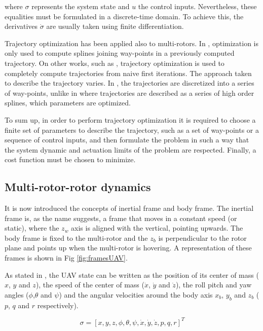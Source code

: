 where $\sigma$ represents the system state and $u$ the control inputs. Nevertheless,  these equalities must be formulated in a discrete-time domain. To achieve this, the derivatives $\dot{\sigma}$ are usually taken using finite differentiation.
\par
Trajectory optimization has been applied also to multi-rotors. In \cite{ref:quad}, optimization is only used to compute splines joining way-points in a previously computed trajectory. On other works, such as \cite{MILP, ETH}, trajectory optimization is used to completely compute trajectories from naive first iterations. The approach taken to describe the trajectory varies. In \cite{MILP}, the trajectories are discretized into a series of way-points, unlike in \cite{ETH} where trajectories are described as a series of high order splines, which parameters are optimized.
\par
To sum up, in order to perform trajectory optimization it is required to choose a finite set of parameters to describe the trajectory, such as a set of way-points or a sequence of control inputs, and then formulate the problem in such a way that the system dynamic and actuation limits of the problem are respected. Finally, a cost function must be chosen to minimize.

\subsection{Multi-rotor-rotor dynamics}
 It is now introduced the concepts of inertial frame and body frame. The inertial frame is, as the name suggests, a frame that moves in a constant speed (or static), where the $z_w$ axis is aligned with the vertical, pointing upwards. The body frame is fixed to the multi-rotor and the $z_b$ is perpendicular to the rotor plane and points up when the multi-rotor is hovering. A representation of these frames is shown in Fig \ref{fig:framesUAV}.
 \par
As stated in \cite{ref:mellingerFlat}, the UAV state can be written as the position of its center of mass ($x$, $y$ and $z$), the speed of the center of mass ($\dot{x}$, $\dot{y}$ and $\dot{z}$), the roll pitch and yaw angles ($\phi$,$\theta$ and $\psi$) and the angular velocities around the body axis $x_b$, $y_b$ and $z_b$ ($p$, $q$ and $r$ respectively).
\par

 
 \begin{equation}
     \sigma=[x,y,z,\phi, \theta, \psi, \dot{x}, \dot{y}, \dot{z}, p, q, r]^T
 \end{equation}
 
